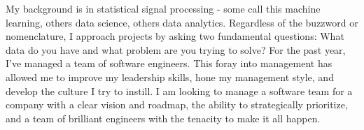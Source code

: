 

\begin{cvparagraph}

  My background is in statistical signal processing - some call this machine learning,
  others data science, others data analytics. Regardless of the buzzword or nomenclature,
  I approach projects by asking two fundamental questions: What data do you have and what
  problem are you trying to solve? For the past year, I've managed a team of software
  engineers. This foray into management has allowed me to improve my leadership skills,
  hone my management style, and develop the culture I try to instill. I am looking to
  manage a software team for a company with a clear vision and roadmap, the ability to
  strategically prioritize, and a team of brilliant engineers with the tenacity to make it
  all happen.
\end{cvparagraph}




